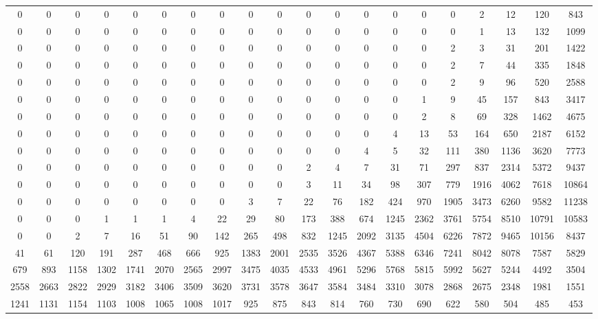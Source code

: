  \begin{tabular}{ | * {20}{c} | } 
0 & 0 & 0 & 0 & 0 & 0 & 0 & 0 & 0 & 0 & 0 & 0 & 0 & 0 & 0 & 0 & 2 & 12 & 120 & 843 \\ 
0 & 0 & 0 & 0 & 0 & 0 & 0 & 0 & 0 & 0 & 0 & 0 & 0 & 0 & 0 & 0 & 1 & 13 & 132 & 1099 \\ 
0 & 0 & 0 & 0 & 0 & 0 & 0 & 0 & 0 & 0 & 0 & 0 & 0 & 0 & 0 & 2 & 3 & 31 & 201 & 1422 \\ 
0 & 0 & 0 & 0 & 0 & 0 & 0 & 0 & 0 & 0 & 0 & 0 & 0 & 0 & 0 & 2 & 7 & 44 & 335 & 1848 \\ 
0 & 0 & 0 & 0 & 0 & 0 & 0 & 0 & 0 & 0 & 0 & 0 & 0 & 0 & 0 & 2 & 9 & 96 & 520 & 2588 \\ 
0 & 0 & 0 & 0 & 0 & 0 & 0 & 0 & 0 & 0 & 0 & 0 & 0 & 0 & 1 & 9 & 45 & 157 & 843 & 3417 \\ 
0 & 0 & 0 & 0 & 0 & 0 & 0 & 0 & 0 & 0 & 0 & 0 & 0 & 0 & 2 & 8 & 69 & 328 & 1462 & 4675 \\ 
0 & 0 & 0 & 0 & 0 & 0 & 0 & 0 & 0 & 0 & 0 & 0 & 0 & 4 & 13 & 53 & 164 & 650 & 2187 & 6152 \\ 
0 & 0 & 0 & 0 & 0 & 0 & 0 & 0 & 0 & 0 & 0 & 0 & 4 & 5 & 32 & 111 & 380 & 1136 & 3620 & 7773 \\ 
0 & 0 & 0 & 0 & 0 & 0 & 0 & 0 & 0 & 0 & 2 & 4 & 7 & 31 & 71 & 297 & 837 & 2314 & 5372 & 9437 \\ 
0 & 0 & 0 & 0 & 0 & 0 & 0 & 0 & 0 & 0 & 3 & 11 & 34 & 98 & 307 & 779 & 1916 & 4062 & 7618 & 10864 \\ 
0 & 0 & 0 & 0 & 0 & 0 & 0 & 0 & 3 & 7 & 22 & 76 & 182 & 424 & 970 & 1905 & 3473 & 6260 & 9582 & 11238 \\ 
0 & 0 & 0 & 1 & 1 & 1 & 4 & 22 & 29 & 80 & 173 & 388 & 674 & 1245 & 2362 & 3761 & 5754 & 8510 & 10791 & 10583 \\ 
0 & 0 & 2 & 7 & 16 & 51 & 90 & 142 & 265 & 498 & 832 & 1245 & 2092 & 3135 & 4504 & 6226 & 7872 & 9465 & 10156 & 8437 \\ 
41 & 61 & 120 & 191 & 287 & 468 & 666 & 925 & 1383 & 2001 & 2535 & 3526 & 4367 & 5388 & 6346 & 7241 & 8042 & 8078 & 7587 & 5829 \\ 
679 & 893 & 1158 & 1302 & 1741 & 2070 & 2565 & 2997 & 3475 & 4035 & 4533 & 4961 & 5296 & 5768 & 5815 & 5992 & 5627 & 5244 & 4492 & 3504 \\ 
2558 & 2663 & 2822 & 2929 & 3182 & 3406 & 3509 & 3620 & 3731 & 3578 & 3647 & 3584 & 3484 & 3310 & 3078 & 2868 & 2675 & 2348 & 1981 & 1551 \\ 
1241 & 1131 & 1154 & 1103 & 1008 & 1065 & 1008 & 1017 & 925 & 875 & 843 & 814 & 760 & 730 & 690 & 622 & 580 & 504 & 485 & 453 \\ 
 \end{tabular} 
